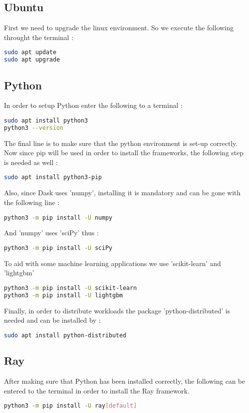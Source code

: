 \documentclass[conference]{IEEEtran}
\begin{document}
\subsection{Ubuntu}
First we need to upgrade the linux environment. So we execute the following throught the terminal :
\begin{lstlisting}[language=bash]
sudo apt update
sudo apt upgrade
\end{lstlisting}
\subsection{Python}
In order to setup Python enter the following to a terminal :
\begin{lstlisting}[language=bash]
sudo apt install python3
python3 --version
\end{lstlisting}
The final line is to make sure that the python environment is set-up correctly. Now since pip will be used in order to install the frameworks, the following step is needed as well :
\begin{lstlisting}[language=bash]
sudo apt install python3-pip
\end{lstlisting}
Also, since Dask uses 'numpy', installing it is mandatory and can be gone with the following line :
\begin{lstlisting}[language=bash]
python3 -m pip install -U numpy
\end{lstlisting}
And 'numpy' uses 'sciPy' thus :
\begin{lstlisting}[language=bash]
python3 -m pip install -U sciPy
\end{lstlisting}
To aid with some machine learning applications we use 'scikit-learn' and 'lightgbm'
\begin{lstlisting}[language=bash]
python3 -m pip install -U scikit-learn
python3 -m pip install -U lightgbm
\end{lstlisting}
Finally, in order to distribute workloads the package 'python-distributed' is needed and can be installed by :
\begin{lstlisting}[language=bash]
sudo apt install python-distributed
\end{lstlisting}
\subsection{Ray}
After making sure that Python has been installed correctly, the following can be entered to the terminal in order to install the Ray framework.
\begin{lstlisting}[language=bash]
python3 -m pip install -U ray[default]
\end{lstlisting}
\end{document}
